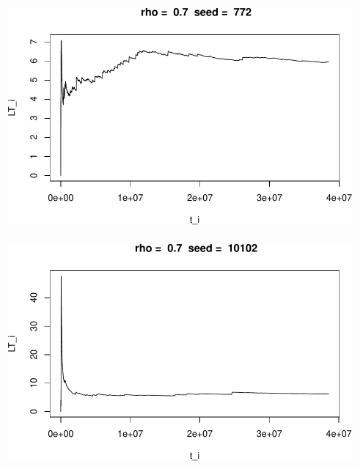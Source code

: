 \documentclass[]{article}
\begin{document}
\begin{figure}[h!]    
\begin{subfigure}[b]{.55\linewidth}   

\includegraphics[width=\linewidth]{003_files/figure-latex/unnamed-chunk-17-1.pdf}
\end{subfigure}\hfill
\begin{subfigure}[b]{.55\linewidth}
\includegraphics[width=\linewidth]{003_files/figure-latex/unnamed-chunk-17-2.pdf}
\end{subfigure}\vfill
\end{figure}
\end{document}
